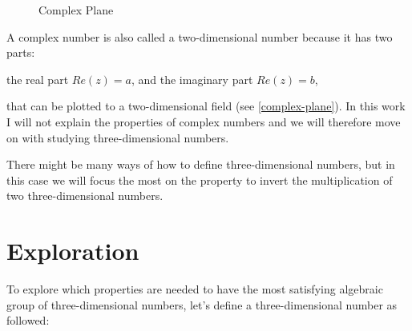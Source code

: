 \documentclass[a4paper,english,parskip]{scrartcl}
\begin{document}
	
	\begin{wrapfigure}[7]{r}{.3\textwidth}
	\vspace{-10pt}
	\caption{Complex Plane}
	\label{complex-plane}
	\end{wrapfigure}
	
	A complex number is also called a two-dimensional number because it has two parts: 
	
	\vspace{-15pt}
	the real part $Re(z) = a$, and the imaginary part $Re(z) = b$, 
	
	\vspace{-15pt}
	that can be plotted to a two-dimensional field (see \autoref{complex-plane}).
	In this work I will not explain the properties of complex numbers and we will therefore move on with 
	studying three-dimensional numbers.
	
	\vspace{15pt}
	
	There might be many ways of how to define three-dimensional numbers, but in this case we will focus the
	most on the property to invert the multiplication of two three-dimensional numbers.
	
	\newpage
	\section{Exploration}
	
To explore which properties are needed to have the most satisfying algebraic group of three-dimensional numbers, let's define a three-dimensional number as followed:
\end{document}
